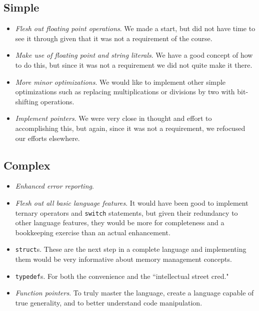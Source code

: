 \documentclass{article}
\begin{document}
\subsection{Simple}
  \begin{itemize}
  \item \textit{Flesh out floating point operations}. We made a start, but did
        not have time to see it through given that it was not a requirement
        of the course.

  \item \textit{Make use of floating point and string literals}. We have a good
        concept of how to do this, but since it was not a requirement we did
        not quite make it there.

  \item \textit{More minor optimizations}. We would like to implement other
        simple optimizations such as replacing multiplications or divisions
        by two with bit-shifting operations.

  \item \textit{Implement pointers}. We were very close in thought and effort
        to accomplishing this, but again, since it was not a requirement, we
        refocused our efforts elsewhere. 
  \end{itemize}

\subsection{Complex}
  \begin{itemize}
  \item \textit{Enhanced error reporting}.

  \item \textit{Flesh out all basic language features}. It would have been good
        to implement ternary operators and \texttt{switch} statements, but given
        their redundancy to other language features, they would be more for 
        completeness and a bookkeeping exercise than an actual enhancement.

  \item \texttt{struct}s. These are the next step in a complete language and
        implementing them would be very informative about memory management
        concepts.

  \item \texttt{typedef}s. For both the convenience and the ``intellectual
        street cred."

  \item \textit{Function pointers}. To truly master the language, create a
        language capable of true generality, and to better understand code
        manipulation. 
  \end{itemize}
\end{document}
